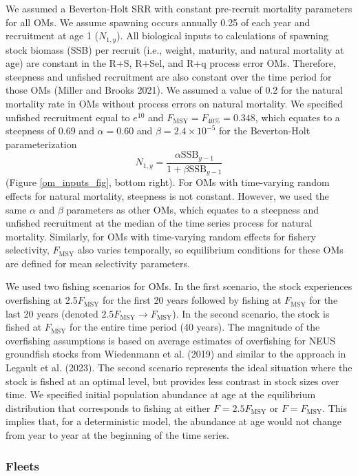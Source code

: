 \documentclass[
  12pt,
]{article}
\newcommand{\Fmsy}{\ensuremath{F_{\text{MSY}}}\xspace}
\begin{document}
We assumed a Beverton-Holt SRR with constant pre-recruit mortality
parameters for all OMs. We assume spawning occurs annually 0.25 of each
year and recruitment at age 1 (\(N_{1,y}\)). All biological inputs to
calculations of spawning stock biomass (SSB) per recruit (i.e., weight,
maturity, and natural mortality at age) are constant in the R+S, R+Sel,
and R+q process error OMs. Therefore, steepness and unfished recruitment
are also constant over the time period for those OMs (Miller and Brooks
2021). We assumed a value of 0.2 for the natural mortality rate in OMs
without process errors on natural mortality. We specified unfished
recruitment equal to \(e^{10}\) and \(\Fmsy = F_{40\%} = 0.348\), which
equates to a steepness of 0.69 and \(\alpha=0.60\) and
\(\beta = 2.4 \times 10^{-5}\) for the Beverton-Holt parameterization \[
N_{1,y} = \frac{\alpha \text{SSB}_{y-1}}{1 + \beta\text{SSB}_{y-1}} 
\] (Figure \ref{om_inputs_fig}, bottom right). For OMs with time-varying
random effects for natural mortality, steepness is not constant.
However, we used the same \(\alpha\) and \(\beta\) parameters as other
OMs, which equates to a steepness and unfished recruitment at the median
of the time series process for natural mortality. Similarly, for OMs
with time-varying random effects for fishery selectivity, \Fmsy also
varies temporally, so equilibrium conditions for these OMs are defined
for mean selectivity parameters.

We used two fishing scenarios for OMs. In the first scenario, the stock
experiences overfishing at 2.5\Fmsy for the first 20 years followed by
fishing at \Fmsy for the last 20 years (denoted
\(2.5\Fmsy \rightarrow \Fmsy\)). In the second scenario, the stock is
fished at \Fmsy for the entire time period (40 years). The magnitude of
the overfishing assumptions is based on average estimates of overfishing
for NEUS groundfish stocks from Wiedenmann et al. (2019) and similar to
the approach in Legault et al. (2023). The second scenario represents
the ideal situation where the stock is fished at an optimal level, but
provides less contrast in stock sizes over time. We specified initial
population abundance at age at the equilibrium distribution that
corresponds to fishing at either \(F = 2.5\Fmsy\) or \(F = \Fmsy\). This
implies that, for a deterministic model, the abundance at age would not
change from year to year at the beginning of the time series.

\subsubsection*{Fleets}\label{fleets}
\end{document}
